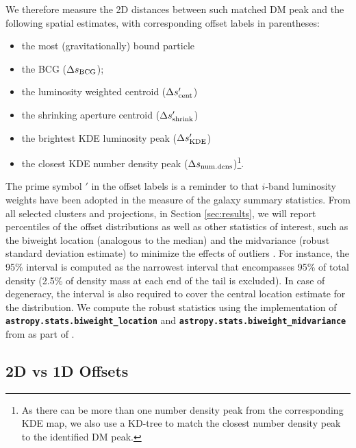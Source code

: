 \documentclass[usenatbib]{mn2e}
\begin{document}
{We therefore measure the 2D distances between such matched DM peak and the following spatial estimates, with corresponding offset labels in parentheses:

\begin{itemize}
	\item the most (gravitationally) bound particle
	\item the BCG ($\Delta s_{\rm BCG}$);
        \item the luminosity weighted centroid ($\Delta s_{\rm cent}'$)
	\item the shrinking aperture centroid ($\Delta s_{\rm shrink}'$) 
	\item the brightest KDE luminosity peak ($\Delta s_{\rm KDE}'$)
	\item the closest KDE number density peak ($\Delta s_{\rm num.dens}$)\footnote{As there can be more than one number density peak from the corresponding KDE
map, we also use a KD-tree to match the closest number density peak to the 
identified DM peak.}.
\end{itemize}


The prime symbol $'$ in the offset labels is a reminder to that $i$-band luminosity weights have been adopted in the measure of the galaxy summary statistics.
From all selected clusters and projections, in Section \ref{sec:results}, we will report percentiles of the offset distributions as well as other statistics of interest, such as the biweight 
location (analogous to the median) and the midvariance (robust standard deviation estimate) to minimize the effects of outliers \citep{Beers90}. 
For instance, the 95\% interval is computed as the narrowest interval that encompasses
95\% of total density (2.5\% of density mass at each end of the tail is
excluded). In case of degeneracy, the interval is also required to cover the 
central location estimate for the distribution.
We compute the robust statistics using the 
implementation of {\bf \texttt{astropy.stats.biweight\_location}}
and {\bf \texttt{astropy.stats.biweight\_midvariance}}
from \cite{astropy} as part of {}. 


\subsection{2D vs 1D Offsets}
\label{subsec:1d}

}
\end{document}
